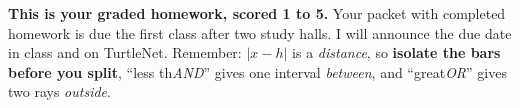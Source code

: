 \documentclass[12pt]{article}
\begin{document}

\vspace{0.10in}

\boxguard[8]
\begin{remindbox}
\small
\textbf{This is your graded homework, scored 1 to 5.} Your packet with completed homework is due the first
class after two study halls. I will announce the due date in class and on TurtleNet. Remember: $|x-h|$ is a \emph{distance}, so \textbf{isolate
the bars before you split}, ``less th\emph{AND}'' gives one interval \emph{between}, and
``great\emph{OR}'' gives two rays \emph{outside}.
\end{remindbox}

\vspace{0.10in}
\end{document}

